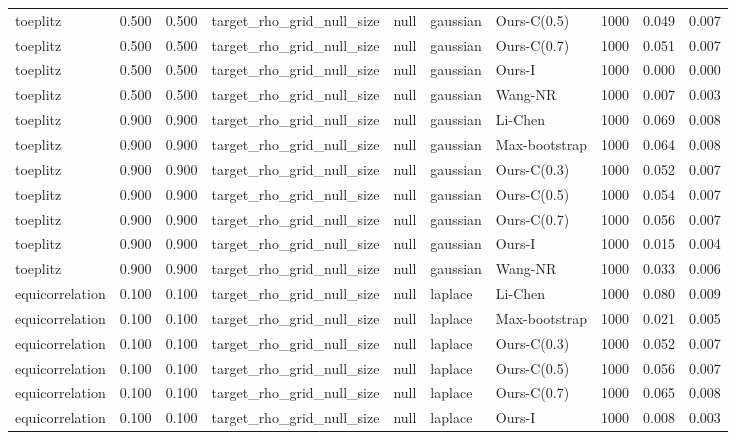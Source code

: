 \begin{tabular}{lrrllllrrr}
toeplitz & 0.500 & 0.500 & target\_rho\_grid\_null\_size & null & gaussian & Ours-C(0.5) & 1000 & 0.049 & 0.007 \\
toeplitz & 0.500 & 0.500 & target\_rho\_grid\_null\_size & null & gaussian & Ours-C(0.7) & 1000 & 0.051 & 0.007 \\
toeplitz & 0.500 & 0.500 & target\_rho\_grid\_null\_size & null & gaussian & Ours-I & 1000 & 0.000 & 0.000 \\
toeplitz & 0.500 & 0.500 & target\_rho\_grid\_null\_size & null & gaussian & Wang-NR & 1000 & 0.007 & 0.003 \\
toeplitz & 0.900 & 0.900 & target\_rho\_grid\_null\_size & null & gaussian & Li-Chen & 1000 & 0.069 & 0.008 \\
toeplitz & 0.900 & 0.900 & target\_rho\_grid\_null\_size & null & gaussian & Max-bootstrap & 1000 & 0.064 & 0.008 \\
toeplitz & 0.900 & 0.900 & target\_rho\_grid\_null\_size & null & gaussian & Ours-C(0.3) & 1000 & 0.052 & 0.007 \\
toeplitz & 0.900 & 0.900 & target\_rho\_grid\_null\_size & null & gaussian & Ours-C(0.5) & 1000 & 0.054 & 0.007 \\
toeplitz & 0.900 & 0.900 & target\_rho\_grid\_null\_size & null & gaussian & Ours-C(0.7) & 1000 & 0.056 & 0.007 \\
toeplitz & 0.900 & 0.900 & target\_rho\_grid\_null\_size & null & gaussian & Ours-I & 1000 & 0.015 & 0.004 \\
toeplitz & 0.900 & 0.900 & target\_rho\_grid\_null\_size & null & gaussian & Wang-NR & 1000 & 0.033 & 0.006 \\
equicorrelation & 0.100 & 0.100 & target\_rho\_grid\_null\_size & null & laplace & Li-Chen & 1000 & 0.080 & 0.009 \\
equicorrelation & 0.100 & 0.100 & target\_rho\_grid\_null\_size & null & laplace & Max-bootstrap & 1000 & 0.021 & 0.005 \\
equicorrelation & 0.100 & 0.100 & target\_rho\_grid\_null\_size & null & laplace & Ours-C(0.3) & 1000 & 0.052 & 0.007 \\
equicorrelation & 0.100 & 0.100 & target\_rho\_grid\_null\_size & null & laplace & Ours-C(0.5) & 1000 & 0.056 & 0.007 \\
equicorrelation & 0.100 & 0.100 & target\_rho\_grid\_null\_size & null & laplace & Ours-C(0.7) & 1000 & 0.065 & 0.008 \\
equicorrelation & 0.100 & 0.100 & target\_rho\_grid\_null\_size & null & laplace & Ours-I & 1000 & 0.008 & 0.003 \\

\end{tabular}
